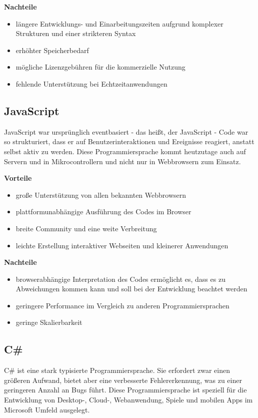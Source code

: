\textbf{Nachteile}
\begin{itemize}
	\item längere Entwicklungs- und Einarbeitungszeiten aufgrund komplexer Strukturen und einer strikteren Syntax
	\item erhöhter Speicherbedarf
	\item mögliche Lizenzgebühren für die kommerzielle Nutzung
	\item fehlende Unterstützung bei Echtzeitanwendungen
\end{itemize}

\subsection{JavaScript}
JavaScript war ursprünglich eventbasiert - das heißt, der JavaScript - Code war so strukturiert, dass er auf Benutzerinteraktionen und Ereignisse reagiert, anstatt selbst aktiv zu werden. Diese Programmiersprache kommt heutzutage auch auf Servern und in Mikrocontrollern und nicht nur in Webbrowsern zum Einsatz. \parencite{Programmiersprachen}

\textbf{Vorteile}
\begin{itemize}
	\item große Unterstützung von allen bekannten Webbrowsern
	\item plattformunabhängige Ausführung des Codes im Browser
	\item breite Community und eine weite Verbreitung
	\item leichte Erstellung interaktiver Webseiten und kleinerer Anwendungen
\end{itemize}

\textbf{Nachteile}
\begin{itemize}
	\item browserabhängige Interpretation des Codes ermöglicht es, dass es zu Abweichungen kommen kann und soll bei der Entwicklung beachtet werden
	\item geringere Performance im Vergleich zu anderen Programmiersprachen
	\item geringe Skalierbarkeit
\end{itemize}

\subsection{C\#}
C\# ist eine stark typisierte Programmiersprache. Sie erfordert zwar einen größeren Aufwand, bietet aber eine verbesserte Fehlererkennung, was zu einer geringeren Anzahl an Bugs führt. Diese Programmiersprache ist speziell für die Entwicklung von Desktop-, Cloud-, Webanwendung, Spiele und mobilen Apps im Microsoft Umfeld ausgelegt. \parencite{Programmiersprachen}

